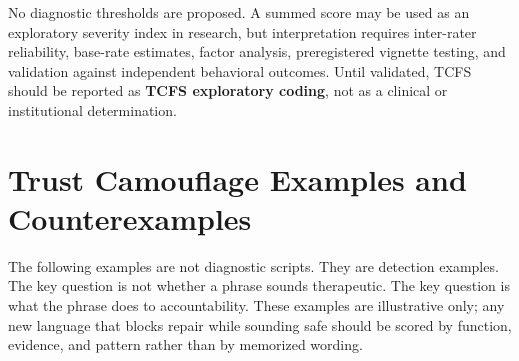 \documentclass[11pt, letterpaper]{article}
\newcommand{\term}[1]{\textbf{#1}}
\begin{document}
No diagnostic thresholds are proposed. A summed score may be used as an exploratory severity index in research, but interpretation requires inter-rater reliability, base-rate estimates, factor analysis, preregistered vignette testing, and validation against independent behavioral outcomes. Until validated, TCFS should be reported as \term{TCFS exploratory coding}, not as a clinical or institutional determination.

\section{Trust Camouflage Examples and Counterexamples}

The following examples are not diagnostic scripts. They are detection examples. The key question is not whether a phrase sounds therapeutic. The key question is what the phrase does to accountability. These examples are illustrative only; any new language that blocks repair while sounding safe should be scored by function, evidence, and pattern rather than by memorized wording.
\end{document}
